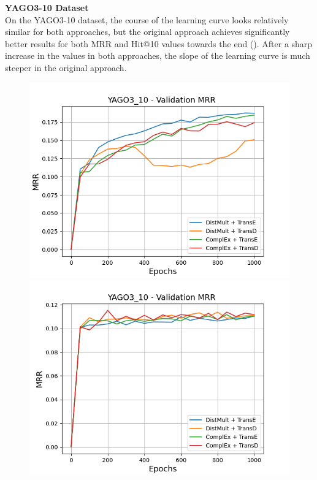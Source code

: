 \textbf{YAGO3-10 Dataset}
\label{subsubsec:uncertainty_yago3_10}\\
%
On the \textsc{YAGO3-10} dataset, the course of the learning curve looks relatively similar for both approaches, but the original approach achieves significantly better results for both MRR and Hit@10 values towards the end ().
After a sharp increase in the values in both approaches, the slope of the learning curve is much steeper in the original \kbgan approach.
\begin{figure}[H]
    \centering
    \begin{minipage}{.5\textwidth}
      \centering
      \includegraphics[width=0.9\linewidth]{figures/results/gan_train/not_pretrained/random/yago3_10/1k_epochs/random_yago3_10_mrrs.png}
    \end{minipage}%
    \begin{minipage}{.5\textwidth}
      \centering
      \includegraphics[width=0.9\linewidth]{figures/results/gan_train/not_pretrained/uncertainty/max_distribution/entropy/yago3_10/1k_epochs/uncertainty_yago3_10_mrrs.png}

\end{minipage}
\end{figure}
